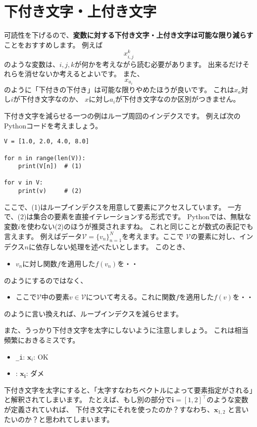 \documentclass[uplatex,twocolumn,9pt,dvipdfmx]{jsarticle}
\begin{document}
\section{下付き文字・上付き文字}
可読性を下げるので、\textbf{変数に対する下付き文字・上付き文字は可能な限り減らす}ことをおすすめします。
例えば
\begin{equation}
    x_{i, j}^k
\end{equation}
のような変数は、$i, j, k$が何かを考えながら読む必要があります。
出来るだけそれらを消せないか考えるとよいです。
また、
\begin{equation}
    x_{a_i}
\end{equation}
のように「下付きの下付き」は可能な限りやめたほうが良いです。
これは$x_a$対し$i$が下付き文字なのか、
$x$に対し$a_i$が下付き文字なのか区別がつきません。

下付き文字を減らせる一つの例はループ周回のインデクスです。
例えば次のPythonコードを考えましょう。
\begin{verbatim}
V = [1.0, 2.0, 4.0, 8.0]

for n in range(len(V)):
    print(V[n])  # (1)

for v in V:
    print(v)     # (2)
\end{verbatim}
ここで、(1)はループインデクスを用意して要素にアクセスしています。
一方で、(2)は集合の要素を直接イテレーションする形式です。
Pythonでは、無駄な変数$i$を使わない(2)のほうが推奨されますね。
これと同じことが数式の表記でも言えます。
例えばデータ$\mathcal{V} = \{v_n\}_{n=1}^N$を考えます。ここで
$\mathcal{V}$の要素に対し、インデクス$n$に依存しない処理を述べたいとします。
このとき、
\begin{itemize}
\item $v_n$に対し関数$f$を適用した$f(v_n)$を・・
\end{itemize}
のようにするのではなく、
\begin{itemize}
\item ここで$\mathcal{V}$中の要素$v \in \mathcal{V}$について考える。これに関数$f$を適用した$f(v)$を・・
\end{itemize}
のように言い換えれば、ループインデクスを減らせます。

また、うっかり下付き文字を太字にしないように注意しましょう。
これは相当頻繁におきるミスです。
\begin{itemize}
    \item \texttt{_i}: $\mathbf{x}_i$: OK
    \item \texttt{}: $\mathbf{x_i}$: ダメ
\end{itemize}
下付き文字を太字にすると、「太字すなわちベクトルによって要素指定がされる」と解釈されてしまいます。
たとえば、もし別の部分で$\mathbf{i}=[1, 2]^\top$のような変数が定義されていれば、
下付き文字にそれを使ったのか？すなわち、$\mathbf{x}_{1, 2}$
と言いたいのか？と思われてしまいます。
\end{document}
